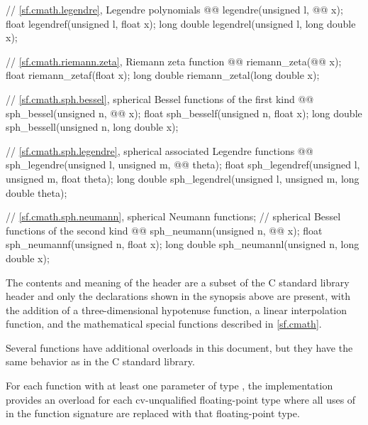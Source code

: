 \begin{codeblock}
{  // \ref{sf.cmath.legendre}, Legendre polynomials
  @@ legendre(unsigned l, @@ x);
  float               legendref(unsigned l, float x);
  long double         legendrel(unsigned l, long double x);

  // \ref{sf.cmath.riemann.zeta}, Riemann zeta function
  @@ riemann_zeta(@@ x);
  float               riemann_zetaf(float x);
  long double         riemann_zetal(long double x);

  // \ref{sf.cmath.sph.bessel}, spherical Bessel functions of the first kind
  @@ sph_bessel(unsigned n, @@ x);
  float               sph_besself(unsigned n, float x);
  long double         sph_bessell(unsigned n, long double x);

  // \ref{sf.cmath.sph.legendre}, spherical associated Legendre functions
  @@ sph_legendre(unsigned l, unsigned m, @@ theta);
  float               sph_legendref(unsigned l, unsigned m, float theta);
  long double         sph_legendrel(unsigned l, unsigned m, long double theta);

  // \ref{sf.cmath.sph.neumann}, spherical Neumann functions;
  // spherical Bessel functions of the second kind
  @@ sph_neumann(unsigned n, @@ x);
  float               sph_neumannf(unsigned n, float x);
  long double         sph_neumannl(unsigned n, long double x);
}
\end{codeblock}

\pnum
The contents and meaning of the header 
are a subset of the C standard library header  and
only the declarations shown in the synopsis above are present,
with the addition of
a three-dimensional hypotenuse function,
a linear interpolation function, and
the mathematical special functions described in \ref{sf.cmath}.
\begin{note}
Several functions have additional overloads in this document,
but they have the same behavior as in the C standard library.
\end{note}

\pnum
For each function
with at least one parameter of type ,
the implementation provides
an overload for each cv-unqualified floating-point type
where all uses of  in the function signature
are replaced with that floating-point type.

